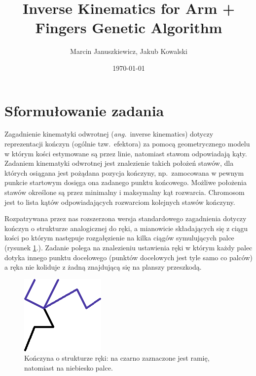 \documentclass[11pt, leqno]{article}
\title{Inverse Kinematics for Arm + Fingers Genetic Algorithm}
\date{\today}
\author{Marcin Januszkiewicz, Jakub Kowalski}
\begin{document}
\maketitle
\vspace{17em}
\tableofcontents
\newpage

\section{Sformułowanie zadania}
Zagadnienie kinematyki odwrotnej (\textit{ang.}\ inverse kinematics) dotyczy reprezentacji kończyn (ogólnie tzw.\ efektora) za pomocą geometrycznego modelu w którym kości estymowane są przez linie, natomiast stawom odpowiadają kąty. Zadaniem kinematyki odwrotnej jest znalezienie takich położeń stawów, dla których osiągana jest pożądana pozycja kończyny, np.\ zamocowana w pewnym punkcie startowym dosięga ona zadanego punktu końcowego. Możliwe położenia stawów określone są przez minimalny i maksymalny kąt rozwarcia. Chromosom jest to lista kątów odpowiadających rozwarciom kolejnych stawów kończyny.

Rozpatrywana przez nas rozszerzona wersja standardowego zagadnienia dotyczy kończyn o strukturze analogicznej do ręki, a mianowicie składających się z ciągu kości po którym następuje rozgałęzienie na kilka ciągów symulujących palce (rysunek \ref{fig:armf}.). Zadanie polega na znalezieniu ustawienia ręki w którym każdy palec dotyka innego punktu docelowego (punktów docelowych jest tyle samo co palców) a ręka nie koliduje z żadną znajdującą się na planszy przeszkodą.

\begin{figure}[h!]
	\centering
	\includegraphics[scale=0.5]{armfingers}
	\caption{Kończyna o strukturze ręki: na czarno zaznaczone jest ramię, natomiast na niebiesko palce.}
	\label{fig:armf}
\end{figure}
\end{document}
